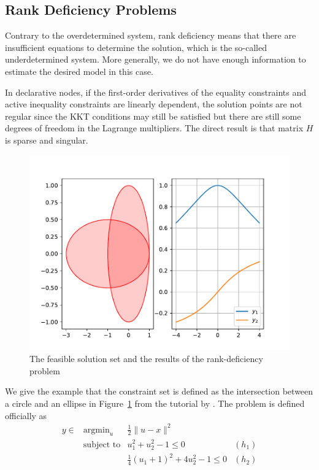 \subsection{Rank Deficiency Problems}
Contrary to the overdetermined system, rank deficiency means that there are insufficient equations to determine the solution, which is the so-called underdetermined system. More generally, we do not have enough information to estimate the desired model in this case. 
\par In declarative nodes, if the first-order derivatives of the equality constraints and active inequality constraints are linearly dependent, the solution points are not regular since the KKT conditions may still be satisfied but there are still some degrees of freedom in the Lagrange multipliers. The direct result is that matrix $H$ is sparse and singular. 
\begin{figure}[t]
    \label{fig:rank-deficiency}
    \centering
    \includegraphics[page=1, width=.8\textwidth]{figs/rankdeficient.pdf}
    \caption{The feasible solution set and the results of the rank-deficiency problem~\citep{SG:19}}
\end{figure}
\par We give the example that the constraint set is defined as the intersection between a circle and an ellipse in Figure~\ref{fig:rank-deficiency} from the tutorial by \citep{SG:19}. The problem is defined officially as
\begin{equation}
    \begin{array}{llll}
        y \in & \text{argmin}_u & \frac{1}{2} \|u - x\|^2 \\
        & \text{subject to} & u_1^2 + u_2^2 - 1 \leq 0 & (h_1) \\
        & & \frac{1}{4}(u_1 + 1)^2 + 4 u_2^2 - 1 \leq 0 & (h_2)
    \end{array}
\end{equation}
